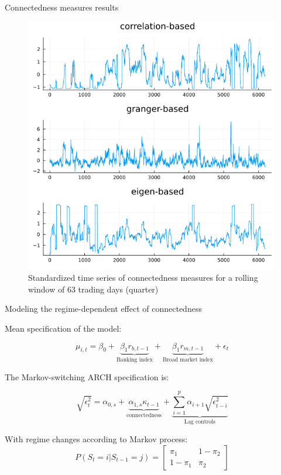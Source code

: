 \documentclass{beamer}
\begin{document}
\begin{frame}{Connectedness measures results}

\begin{figure}[H]
    \caption{Standardized time series of connectedness measures for a rolling window of 63 trading days (quarter)}
    \includegraphics[scale=0.3]{connectmeasures.png}
    \centering
\end{figure}    

\end{frame}    

\begin{frame}{Modeling the regime-dependent effect of connectedness}

Mean specification of the model: 

$$\mu_{i,t} = \beta_0 + \underbrace{\beta_1 r_{b,t-1}}_{\text{Banking index}} + \underbrace{\beta_1 r_{m,t-1}}_{\text{Broad market index}} + \epsilon_t$$

The Markov-switching ARCH specification is:

$$\sqrt{\epsilon^2_t} = \alpha_{0,s} + \underbrace{\alpha_{1,s}\kappa_{t-1}}_{\text{connectedness}} + \underbrace{\sum_{i=1}^{p} \alpha_{i+1} \sqrt{\epsilon^2_{t-i}}}_{\text{Lag controls}}$$


With regime changes according to Markov process: \begin{equation*}
    P(S_t = i | S_{t-1} = j) = \begin{bmatrix}
      \pi_1 & 1 - \pi_2\\
        1 - \pi_1 & \pi_2
        \end{bmatrix}
\end{equation*}

\end{frame}
\end{document}
